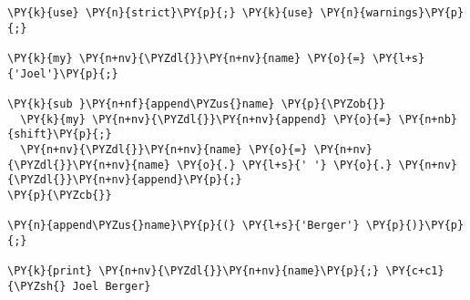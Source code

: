 \begin{Verbatim}[commandchars=\\\{\}]
\PY{k}{use} \PY{n}{strict}\PY{p}{;} \PY{k}{use} \PY{n}{warnings}\PY{p}{;}

\PY{k}{my} \PY{n+nv}{\PYZdl{}}\PY{n+nv}{name} \PY{o}{=} \PY{l+s}{'Joel'}\PY{p}{;}

\PY{k}{sub }\PY{n+nf}{append\PYZus{}name} \PY{p}{\PYZob{}}
  \PY{k}{my} \PY{n+nv}{\PYZdl{}}\PY{n+nv}{append} \PY{o}{=} \PY{n+nb}{shift}\PY{p}{;}
  \PY{n+nv}{\PYZdl{}}\PY{n+nv}{name} \PY{o}{=} \PY{n+nv}{\PYZdl{}}\PY{n+nv}{name} \PY{o}{.} \PY{l+s}{' '} \PY{o}{.} \PY{n+nv}{\PYZdl{}}\PY{n+nv}{append}\PY{p}{;}
\PY{p}{\PYZcb{}}

\PY{n}{append\PYZus{}name}\PY{p}{(} \PY{l+s}{'Berger'} \PY{p}{)}\PY{p}{;}

\PY{k}{print} \PY{n+nv}{\PYZdl{}}\PY{n+nv}{name}\PY{p}{;} \PY{c+c1}{\PYZsh{} Joel Berger}
\end{Verbatim}
